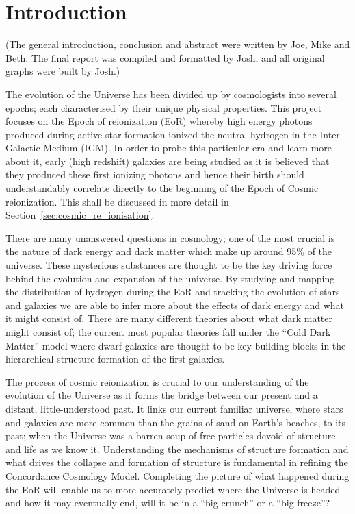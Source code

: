 
\newpage
\section{Introduction} %
\label{section:Introduction}
	(The general introduction, conclusion and abstract were written by Joe, Mike and Beth. The final report was compiled and formatted by Josh, and all original graphs were built by Josh.)

	The evolution of the Universe has been divided up by cosmologists into several epochs; each characterised by their unique physical properties. This project focuses on the Epoch of reionization (EoR) whereby high energy photons produced during active star formation ionized the neutral hydrogen in the Inter-Galactic Medium (IGM). In order to probe this particular era and learn more about it, early (high redshift) galaxies are being studied as it is believed that they produced these first ionizing photons and hence their birth should understandably correlate directly to the beginning of the Epoch of Cosmic reionization. This shall be discussed in more detail in Section~\ref{sec:cosmic_re_ionisation}.

	There are many unanswered questions in cosmology; one of the most crucial is the nature of dark energy and dark matter which make up around 95\% of the universe\cite{WMAP9}. These mysterious substances are thought to be the key driving force behind the evolution and expansion of the universe. By studying and mapping the distribution of hydrogen during the EoR and tracking the evolution of stars and galaxies we are able to infer more about the effects of dark energy and what it might consist of. There are many different theories about what dark matter might consist of; the current most popular theories fall under the ``Cold Dark Matter'' model where dwarf galaxies are thought to be key building blocks in the hierarchical structure formation of the first galaxies\cite{Cignoni}.

	The process of cosmic reionization is crucial to our understanding of the evolution of the Universe as it forms the bridge between our present and a distant, little-understood past. It links our current familiar universe, where stars and galaxies are more common than the grains of sand on Earth's beaches, to its past; when the Universe was a barren soup of free particles devoid of structure and life as we know it. Understanding the mechanisms of structure formation and what drives the collapse and formation of structure is fundamental in refining the Concordance Cosmology Model. Completing the picture of what happened during the EoR will enable us to more accurately predict where the Universe is headed and how it may eventually end, will it be in a ``big crunch'' or a ``big freeze''?

